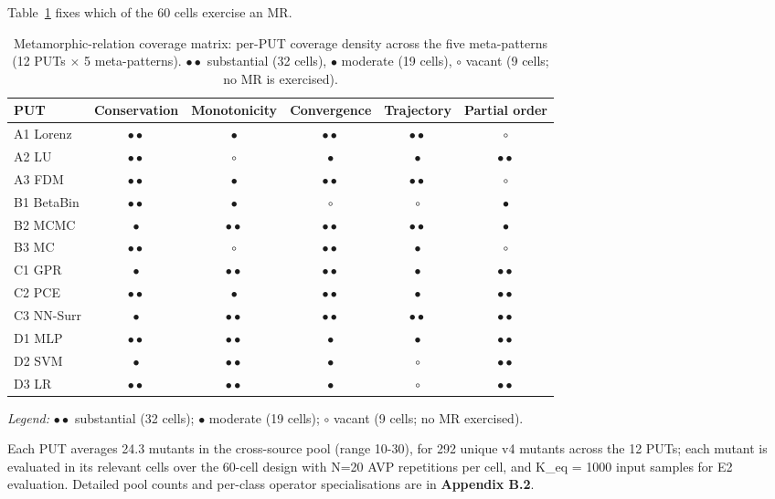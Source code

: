 \documentclass[review,12pt,authoryear]{elsarticle}
\begin{document}
Table~\ref{tab:p2-cells} fixes which of the 60 cells exercise an MR.
{\def\LTcaptype{table}
\small
\begin{longtable}[]{@{}lccccc@{}}
\caption{Metamorphic-relation coverage matrix: per-PUT coverage density across the five meta-patterns (12 PUTs $\times$ 5 meta-patterns). $\bullet\bullet$ substantial (32 cells), $\bullet$ moderate (19 cells), $\circ$ vacant (9 cells; no MR is exercised).}\label{tab:p2-cells}\\
\toprule\noalign{}
PUT & Conservation & Monotonicity & Convergence & Trajectory & Partial order \\
\midrule\noalign{}
\endfirsthead
\endhead
\bottomrule\noalign{}
\endlastfoot
A1 Lorenz  & $\bullet\bullet$ & $\bullet$ & $\bullet\bullet$ & $\bullet\bullet$ & $\circ$ \\
A2 LU      & $\bullet\bullet$ & $\circ$ & $\bullet$ & $\bullet$ & $\bullet\bullet$ \\
A3 FDM     & $\bullet\bullet$ & $\bullet$ & $\bullet\bullet$ & $\bullet\bullet$ & $\circ$ \\
B1 BetaBin & $\bullet\bullet$ & $\bullet$ & $\circ$ & $\circ$ & $\bullet$ \\
B2 MCMC    & $\bullet$ & $\bullet\bullet$ & $\bullet\bullet$ & $\bullet\bullet$ & $\bullet$ \\
B3 MC      & $\bullet\bullet$ & $\circ$ & $\bullet\bullet$ & $\bullet$ & $\circ$ \\
C1 GPR     & $\bullet$ & $\bullet\bullet$ & $\bullet\bullet$ & $\bullet$ & $\bullet\bullet$ \\
C2 PCE     & $\bullet\bullet$ & $\bullet$ & $\bullet\bullet$ & $\bullet$ & $\bullet\bullet$ \\
C3 NN-Surr & $\bullet$ & $\bullet\bullet$ & $\bullet\bullet$ & $\bullet\bullet$ & $\bullet\bullet$ \\
D1 MLP     & $\bullet\bullet$ & $\bullet\bullet$ & $\bullet$ & $\bullet$ & $\bullet\bullet$ \\
D2 SVM     & $\bullet$ & $\bullet\bullet$ & $\bullet$ & $\circ$ & $\bullet\bullet$ \\
D3 LR      & $\bullet\bullet$ & $\bullet\bullet$ & $\bullet$ & $\circ$ & $\bullet\bullet$ \\
\end{longtable}
}

\noindent\emph{Legend:} $\bullet\bullet$ substantial (32 cells); $\bullet$ moderate (19 cells); $\circ$ vacant (9 cells; no MR exercised).

Each PUT averages 24.3 mutants in the cross-source pool (range
10-30), for 292 unique v4 mutants across the 12 PUTs; each mutant is
evaluated in its relevant cells over the 60-cell design with N=20 AVP
repetitions per cell, and K\_eq = 1000 input samples for E2 evaluation. Detailed
pool counts and per-class operator specialisations are in
\textbf{Appendix B.2}.
\end{document}

